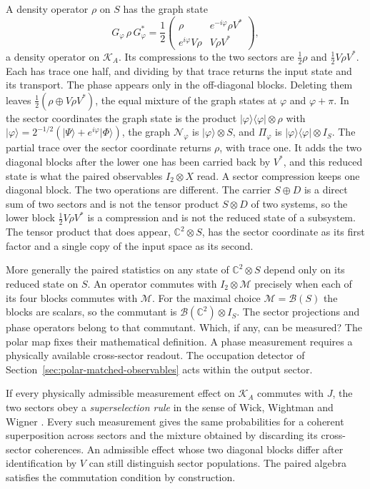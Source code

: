 \documentclass[11pt]{article}
\theoremstyle{definition}
\newcommand{\C}{\mathbb C}
\newcommand{\ket}[1]{\lvert #1\rangle}
\newcommand{\bra}[1]{\langle #1\rvert}
\begin{document}
A density operator $\rho$ on $S$ has the graph state
\begin{equation}
 G_\varphi\,\rho\,G_\varphi^*
 =\frac12\begin{pmatrix}\rho&e^{-i\varphi}\rho V^*\\ e^{i\varphi}V\rho&V\rho V^*\end{pmatrix},
 \label{eq:graph-density-blocks}
\end{equation}
a density operator on $\mathcal K_A$. Its compressions to the two sectors are $\tfrac12\rho$ and $\tfrac12V\rho V^*$. Each has trace one half, and dividing by that trace returns the input state and its transport. The phase appears only in the off-diagonal blocks. Deleting them leaves $\tfrac12(\rho\oplus V\rho V^*)$, the equal mixture of the graph states at $\varphi$ and $\varphi+\pi$. In the sector coordinates the graph state is the product $\ket{\varphi}\!\bra{\varphi}\otimes\rho$ with $\ket{\varphi}=2^{-1/2}(\ket{\Psi}+e^{i\varphi}\ket{\Phi})$, the graph $\mathcal N_\varphi$ is $\ket{\varphi}\otimes S$, and $\Pi_\varphi$ is $\ket{\varphi}\!\bra{\varphi}\otimes I_S$. The partial trace over the sector coordinate returns $\rho$, with trace one. It adds the two diagonal blocks after the lower one has been carried back by $V^*$, and this reduced state is what the paired observables $I_2\otimes X$ read. A sector compression keeps one diagonal block. The two operations are different. The carrier $S\oplus D$ is a direct sum of two sectors and is not the tensor product $S\otimes D$ of two systems, so the lower block $\tfrac12V\rho V^*$ is a compression and is not the reduced state of a subsystem. The tensor product that does appear, $\C^2\otimes S$, has the sector coordinate as its first factor and a single copy of the input space as its second.

More generally the paired statistics on any state of $\C^2\otimes S$ depend only on its reduced state on $S$. An operator commutes with $I_2\otimes\mathcal M$ precisely when each of its four blocks commutes with $\mathcal M$. For the maximal choice $\mathcal M=\mathcal B(S)$ the blocks are scalars, so the commutant is $\mathcal B(\C^2)\otimes I_S$. The sector projections and phase operators belong to that commutant. Which, if any, can be measured? The polar map fixes their mathematical definition. A phase measurement requires a physically available cross-sector readout. The occupation detector of Section~\ref{sec:polar-matched-observables} acts within the output sector.

If every physically admissible measurement effect on $\mathcal K_A$ commutes with $J$, the two sectors obey a \emph{superselection rule} in the sense of Wick, Wightman and Wigner \cite{WickWightmanWigner1952}. Every such measurement gives the same probabilities for a coherent superposition across sectors and the mixture obtained by discarding its cross-sector coherences. An admissible effect whose two diagonal blocks differ after identification by $V$ can still distinguish sector populations. The paired algebra satisfies the commutation condition by construction.
\end{document}
